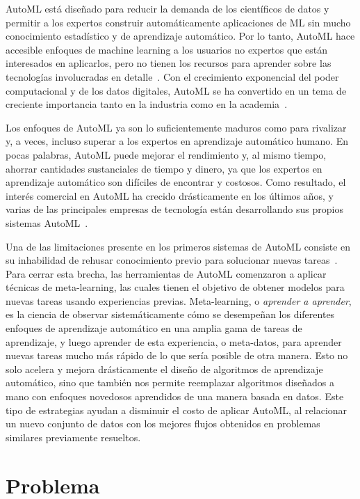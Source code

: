 AutoML está diseñado para reducir la demanda de los científicos de datos y permitir a los expertos construir automáticamente aplicaciones de ML sin mucho conocimiento estadístico y de aprendizaje automático. Por lo tanto, AutoML hace accesible enfoques de machine learning a los usuarios no expertos que están interesados en aplicarlos, pero no tienen los recursos para aprender sobre las tecnologías involucradas en detalle~\cite{hutter2019autmlbook}. Con el crecimiento exponencial del poder computacional y de los datos digitales, AutoML se ha convertido en un tema de creciente importancia tanto en la industria como en la academia~\cite{xin2019automl}. 

Los enfoques de AutoML ya son lo suficientemente maduros como para
rivalizar y, a veces, incluso superar a los expertos en aprendizaje automático humano. En pocas palabras, AutoML puede mejorar el rendimiento y, al mismo tiempo, ahorrar cantidades sustanciales de tiempo y dinero, ya que los expertos en aprendizaje automático son difíciles de encontrar y costosos. Como resultado, el interés comercial en AutoML ha crecido drásticamente en los últimos años, y varias de las principales empresas de tecnología están desarrollando sus propios sistemas AutoML~\cite{hutter2019autmlbook}.

Una de las limitaciones presente en los primeros sistemas de AutoML consiste en su inhabilidad de rehusar conocimiento previo para solucionar nuevas tareas~\cite{dyrmishi2019decision}. Para cerrar esta brecha, las herramientas de AutoML comenzaron a aplicar técnicas de meta-learning, las cuales tienen el objetivo de obtener modelos para nuevas tareas usando experiencias previas. Meta-learning, o \textit{aprender a aprender}, es la ciencia de observar sistemáticamente cómo se desempeñan los diferentes enfoques de aprendizaje automático en una amplia gama de tareas de aprendizaje, y luego aprender de esta experiencia, o meta-datos, para aprender nuevas tareas mucho más rápido de lo que sería posible de otra manera. Esto no solo acelera y mejora drásticamente el diseño de algoritmos de aprendizaje automático, sino que también nos permite reemplazar algoritmos diseñados a mano con enfoques novedosos aprendidos de una manera basada en datos. Este tipo de estrategias ayudan a disminuir el costo de aplicar AutoML, al relacionar un nuevo conjunto de datos con los mejores flujos obtenidos en problemas similares previamente resueltos. 

\section*{Problema}

